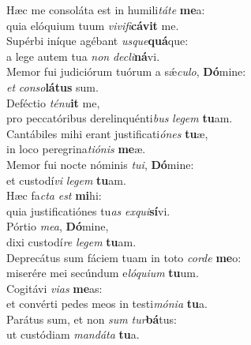 \evenverse Hæc me consoláta est in humili\textit{tá}\textit{te} \textbf{me}a:~\*\\
\evenverse quia elóquium tuum \textit{vi}\textit{vi}\textit{fi}\textbf{cá}\textbf{vit} me.\\
\oddverse Supérbi iníque agébant \textit{us}\textit{que}\textbf{quá}que:~\*\\
\oddverse a lege autem tua \textit{non} \textit{de}\textit{cli}\textbf{ná}vi.\\
\evenverse Memor fui judiciórum tuórum a sǽ\textit{cu}\textit{lo}, \textbf{Dó}mine:~\*\\
\evenverse \textit{et} \textit{con}\textit{so}\textbf{lá}\textbf{tus} sum.\\
\oddverse Deféctio \textit{té}\textit{nu}\textbf{it} me,~\*\\
\oddverse pro peccatóribus derelinquénti\textit{bus} \textit{le}\textit{gem} \textbf{tu}am.\\
\evenverse Cantábiles mihi erant justificati\textit{ó}\textit{nes} \textbf{tu}æ,~\*\\
\evenverse in loco peregrina\textit{ti}\textit{ó}\textit{nis} \textbf{me}æ.\\
\oddverse Memor fui nocte nóminis \textit{tu}\textit{i}, \textbf{Dó}mine:~\*\\
\oddverse et custodí\textit{vi} \textit{le}\textit{gem} \textbf{tu}am.\\
\evenverse Hæc fa\textit{cta} \textit{est} \textbf{mi}hi:~\*\\
\evenverse quia justificatiónes tu\textit{as} \textit{ex}\textit{qui}\textbf{sí}vi.\\
\oddverse Pórtio \textit{me}\textit{a}, \textbf{Dó}mine,~\*\\
\oddverse dixi custodí\textit{re} \textit{le}\textit{gem} \textbf{tu}am.\\
\evenverse Deprecátus sum fáciem tuam in toto \textit{cor}\textit{de} \textbf{me}o:~\*\\
\evenverse miserére mei secúndum e\textit{ló}\textit{qui}\textit{um} \textbf{tu}um.\\
\oddverse Cogitávi \textit{vi}\textit{as} \textbf{me}as:~\*\\
\oddverse et convérti pedes meos in testi\textit{mó}\textit{ni}\textit{a} \textbf{tu}a.\\
\evenverse Parátus sum, et non \textit{sum} \textit{tur}\textbf{bá}tus:~\*\\
\evenverse ut custódiam \textit{man}\textit{dá}\textit{ta} \textbf{tu}a.\\
